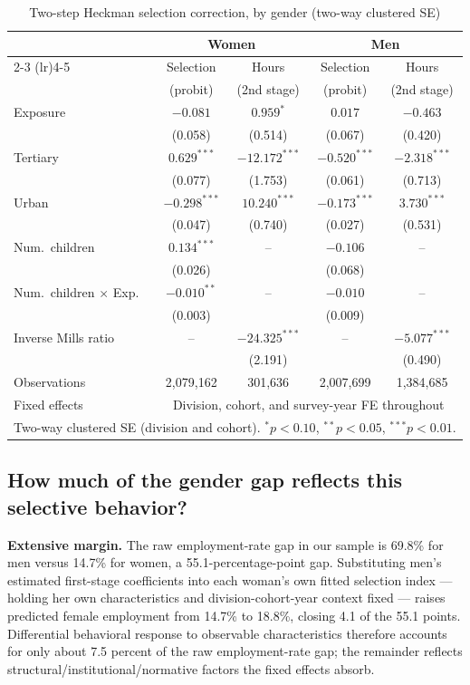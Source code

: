 \documentclass[11pt]{article}
\begin{document}
\begin{table}[htbp]
\centering
\caption{Two-step Heckman selection correction, by gender (two-way clustered SE)}
\label{tab:heckman}
\footnotesize
\begin{tabular}{lcccc}
\toprule
 & \multicolumn{2}{c}{Women} & \multicolumn{2}{c}{Men} \\
 \cmidrule(lr){2-3} \cmidrule(lr){4-5}
 & Selection & Hours & Selection & Hours \\
 & (probit) & (2nd stage) & (probit) & (2nd stage) \\
\midrule
Exposure & $-0.081$ & $0.959^{*}$ & $0.017$ & $-0.463$ \\
 & (0.058) & (0.514) & (0.067) & (0.420) \\
Tertiary & $0.629^{***}$ & $-12.172^{***}$ & $-0.520^{***}$ & $-2.318^{***}$ \\
 & (0.077) & (1.753) & (0.061) & (0.713) \\
Urban & $-0.298^{***}$ & $10.240^{***}$ & $-0.173^{***}$ & $3.730^{***}$ \\
 & (0.047) & (0.740) & (0.027) & (0.531) \\
Num.\ children & $0.134^{***}$ & -- & $-0.106$ & -- \\
 & (0.026) & & (0.068) & \\
Num.\ children $\times$ Exp. & $-0.010^{**}$ & -- & $-0.010$ & -- \\
 & (0.003) & & (0.009) & \\
Inverse Mills ratio & -- & $-24.325^{***}$ & -- & $-5.077^{***}$ \\
 & & (2.191) & & (0.490) \\
\midrule
Observations & 2,079,162 & 301,636 & 2,007,699 & 1,384,685 \\
Fixed effects & \multicolumn{4}{c}{Division, cohort, and survey-year FE throughout} \\
\bottomrule
\multicolumn{5}{p{0.95\textwidth}}{\footnotesize Two-way clustered SE (division and cohort). $^{*}p<0.10$, $^{**}p<0.05$, $^{***}p<0.01$.}
\end{tabular}
\end{table}

\subsection{How much of the gender gap reflects this selective behavior?}

\textbf{Extensive margin.} The raw employment-rate gap in our sample is 69.8\% for men versus 14.7\% for women, a 55.1-percentage-point gap. Substituting men's estimated first-stage coefficients into each woman's own fitted selection index --- holding her own characteristics and division-cohort-year context fixed --- raises predicted female employment from 14.7\% to 18.8\%, closing 4.1 of the 55.1 points. Differential behavioral response to observable characteristics therefore accounts for only about 7.5 percent of the raw employment-rate gap; the remainder reflects structural/institutional/normative factors the fixed effects absorb.
\end{document}
